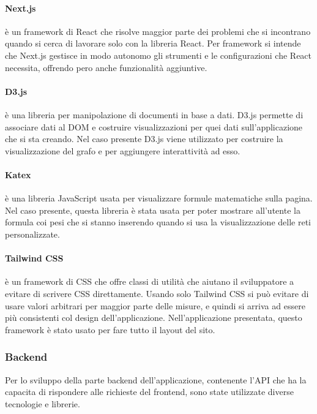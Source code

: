 \documentclass[a4paper,12pt]{report}
\begin{document}
			\paragraph*{Next.js} è un framework di React che risolve maggior parte dei problemi che si incontrano quando si cerca di lavorare solo con la libreria React. Per framework si intende che Next.js gestisce in modo autonomo gli strumenti e le configurazioni che React necessita, offrendo pero anche funzionalità aggiuntive. \cite{nextjs} 

			\paragraph*{D3.js} è una libreria per manipolazione di documenti in base a dati. D3.js permette di associare dati al DOM e costruire visualizzazioni per quei dati sull'applicazione che si sta creando. Nel caso presente D3.js viene utilizzato per costruire la visualizzazione del grafo e per aggiungere interattività ad esso. \cite{d3js} 

			\paragraph*{Katex} è una libreria JavaScript usata per visualizzare formule matematiche sulla pagina. Nel caso presente, questa libreria è stata usata per poter mostrare all'utente la formula coi pesi che si stanno inserendo quando si usa la visualizzazione delle reti personalizzate. \cite{katex} 

			\paragraph*{Tailwind CSS} è un framework di CSS che offre classi di utilità che aiutano il sviluppatore a evitare di scrivere CSS direttamente. Usando solo Tailwind CSS si può evitare di usare valori arbitrari per maggior parte delle misure, e quindi si arriva ad essere più consistenti col design dell'applicazione. Nell'applicazione presentata, questo framework è stato usato per fare tutto il layout del sito. \cite{tailwindcss} 

			\subsubsection{Backend}

			Per lo sviluppo della parte backend dell'applicazione, contenente l'API che ha la capacita di rispondere alle richieste del frontend, sono state utilizzate diverse tecnologie e librerie.
\end{document}

